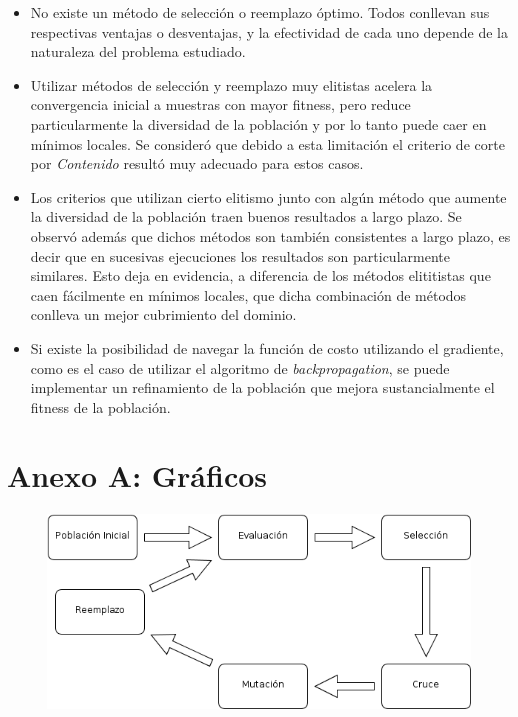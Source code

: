 \documentclass[%
    final,
    reprint,
    notitlepage,
    narroweqnarray,
    inline,
    twoside,
    invited
    ]{ieee}
\begin{document}
\begin{itemize}
\item No existe un método de selección o reemplazo óptimo. Todos conllevan sus respectivas ventajas o 
desventajas, y la efectividad de cada uno depende de la naturaleza del problema estudiado.
\item Utilizar métodos de selección y reemplazo muy elitistas acelera la convergencia inicial a muestras 
con mayor fitness, pero reduce particularmente la diversidad de la población y por lo tanto puede 
caer en mínimos locales. Se consideró que debido a esta limitación el criterio de corte por \textit{Contenido} 
resultó muy adecuado para estos casos.
\item Los criterios que utilizan cierto elitismo junto con algún método que aumente la diversidad de la población 
traen buenos resultados a largo plazo. Se observó además que dichos métodos son también consistentes a largo plazo, 
es decir que en sucesivas ejecuciones los resultados son particularmente similares. Esto deja en evidencia, a 
diferencia de los métodos elititistas que caen fácilmente en mínimos locales, que dicha combinación de métodos 
conlleva un mejor cubrimiento del dominio.
\item Si existe la posibilidad de navegar la función de costo utilizando el gradiente, como es el caso de 
utilizar el algoritmo de \textit{backpropagation}, se puede implementar un refinamiento de la población que 
mejora sustancialmente el fitness de la población.
\end{itemize}


\clearpage
\onecolumn

\section*{Anexo A: Gráficos}


\begin{figure}[H]
\begin{center}
\includegraphics[scale=0.650]{./images/Dibujo1.png}
\label{modelado}
\end{center}
\end{figure}
\end{document}
